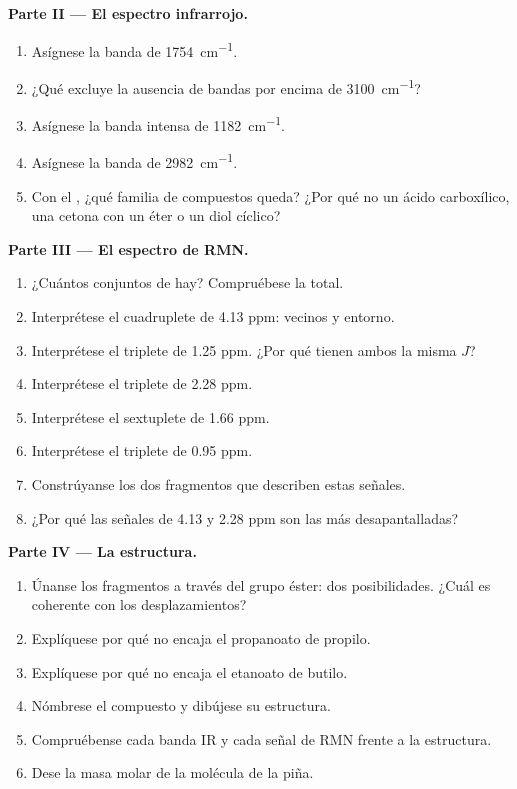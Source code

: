 \begin{problem}
\medskip
\noindent\textbf{Parte II --- El espectro infrarrojo.}
\begin{enumerate}[resume]
  \item Asígnese la banda de \qty{1754}{cm^{-1}}.
  \item ¿Qué excluye la ausencia de bandas por encima de
        \qty{3100}{cm^{-1}}?
  \item Asígnese la banda intensa de \qty{1182}{cm^{-1}}.
  \item Asígnese la banda de \qty{2982}{cm^{-1}}.
  \item Con el , ¿qué familia de compuestos queda?
        ¿Por qué no un ácido carboxílico, una cetona con un éter o un
        diol cíclico?
\end{enumerate}

\medskip
\noindent\textbf{Parte III --- El espectro de RMN.}
\begin{enumerate}[resume]
  \item ¿Cuántos conjuntos de  hay? Compruébese la
         total.
  \item Interprétese el cuadruplete de 4.13 ppm: vecinos y entorno.
  \item Interprétese el triplete de 1.25 ppm. ¿Por qué tienen ambos la
        misma $J$?
  \item Interprétese el triplete de 2.28 ppm.
  \item Interprétese el sextuplete de 1.66 ppm.
  \item Interprétese el triplete de 0.95 ppm.
  \item Constrúyanse los dos fragmentos que describen estas señales.
  \item ¿Por qué las señales de 4.13 y 2.28 ppm son las más
        desapantalladas?
\end{enumerate}

\medskip
\noindent\textbf{Parte IV --- La estructura.}
\begin{enumerate}[resume]
  \item Únanse los fragmentos a través del grupo éster: dos
        posibilidades. ¿Cuál es coherente con los desplazamientos?
  \item Explíquese por qué no encaja el propanoato de propilo.
  \item Explíquese por qué no encaja el etanoato de butilo.
  \item Nómbrese el compuesto y dibújese su estructura.
  \item Compruébense cada banda IR y cada señal de RMN frente a la
        estructura.
  \item Dese la masa molar de la molécula de la piña.
\end{enumerate}
\end{problem}
